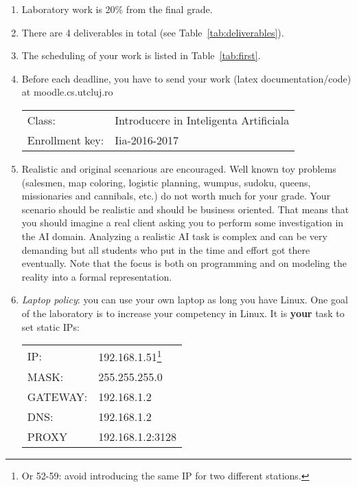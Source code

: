 \begin{enumerate}
 \item Laboratory work is 20\% from the final grade. 
 \item There are 4 deliverables in total (see Table~\ref{tab:deliverables}).
\item The scheduling of your work is listed in Table~\ref{tab:first}.
\item Before each deadline, you have to send your work (latex documentation/code) at moodle.cs.utcluj.ro

\begin{center}
\begin{tabular}{ll}
Class: & Introducere in Inteligenta Artificiala\\
Enrollment key: & Iia-2016-2017\\
\end{tabular}

\end{center}


\item Realistic and original scenarious are encouraged. Well known toy problems (salesmen, map coloring, logistic planning, wumpus, sudoku, queens, missionaries and cannibals, etc.) do not worth much for your grade. 
Your scenario should be realistic and should be business oriented. That means that you should imagine a real client asking you to perform some investigation in the AI domain.
Analyzing a realistic AI task is complex and can be very
demanding but all students who put in the time and effort got there eventually.
Note that the focus is both on programming and on modeling the reality into a formal representation.

\item {\it Laptop policy}: you can use your own laptop as long you have Linux. One goal of the laboratory is to increase your competency in Linux. It is \textbf{your} task to set static IPs:
\begin{center}
\begin{tabular}{ll}
IP: & 192.168.1.51\footnote{Or 52-59: avoid introducing the same IP for two different stations.}\\ 
MASK:&  255.255.255.0\\
GATEWAY:&  192.168.1.2\\
DNS:& 192.168.1.2\\
PROXY & 192.168.1.2:3128\\
\end{tabular}


\end{center}
\end{enumerate}
